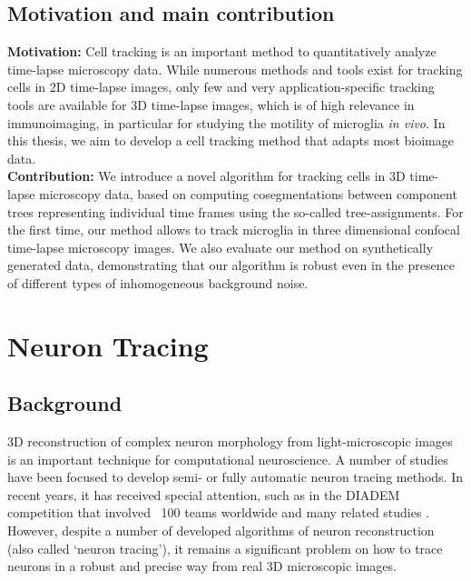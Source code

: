 \subsection{Motivation and main contribution}
\textbf{Motivation:} Cell tracking is an important method to quantitatively analyze time-lapse microscopy data. While numerous methods and tools exist for tracking cells in 2D time-lapse images, only few and very application-specific tracking tools are available for 3D time-lapse images, which is of high relevance in immunoimaging, in particular for studying the motility of microglia \emph{in vivo}. In this thesis, we aim to develop a cell tracking method that adapts most bioimage data.
\\
\textbf{Contribution:} We introduce a novel algorithm for tracking cells in 3D time-lapse microscopy data, based on computing cosegmentations between component trees representing individual time frames using the so-called tree-assignments. For the first time, our method allows to track microglia in three dimensional confocal time-lapse microscopy images. We also evaluate our method on synthetically generated data, demonstrating that our algorithm is robust even in the presence of different types of inhomogeneous background noise.

\section{Neuron Tracing}
\subsection{Background}
3D reconstruction of complex neuron morphology from light-microscopic images is an important technique for computational neuroscience. A number of studies \cite{al2002rapid, al2003median, abdul2005automatic, cai2008using, dima2002automatic, evers2005progress, meijering2004design, narro2007neuronmetrics, rodriguez2008automated, schmitt2004new, sun2009fast, vasilkoski2009detection, wearne2005new, weaver2004automated, xiong2006automated, yuan2009mdl, zhang2004tracking, zhang2007novel,zhang2007automated} have been focused to develop semi- or fully automatic neuron tracing methods. In recent years, it has received special attention, such as in the DIADEM competition \cite{brown2011diadem, gillette2011diademchallenge} that involved ~100 teams worldwide and many related studies \cite{al2002rapid, choromanska2012automatic, cohen1994automated, donohue2011automated, lu2009semi, meijering2004design, meijering2010neuron, narayanaswamy20113, narro2007neuronmetrics, peng2011automatic, peng2010v3d, peng2010automatic, vallotton2007automated, wang2011broadly, xiong2006automated, zhang2007novel, zhang2007automated, zhao2011automated}. However, despite a number of developed algorithms of neuron reconstruction (also called ‘neuron tracing’), it remains a significant problem on how to trace neurons in a robust and precise way from real 3D microscopic images.

